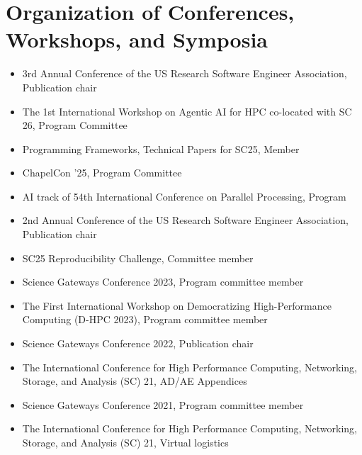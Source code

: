 \documentclass[11pt,a4paper,sans]{moderncv}
\begin{document}
\section{Organization of Conferences, Workshops, and Symposia}
\begin{itemize}[leftmargin=4cm]
\item 3rd Annual Conference of the US Research Software Engineer Association, Publication chair
\item The 1st International Workshop on Agentic AI for HPC co-located with SC 26, Program Committee 
\item Programming Frameworks, Technical Papers for SC25, Member
\item ChapelCon '25, Program Committee 
\item AI track of 54th International Conference on Parallel Processing, Program 
\item 2nd Annual Conference of the US Research Software Engineer Association, Publication chair
\item SC25 Reproducibility Challenge, Committee member
\item Science Gateways Conference 2023, Program committee member
\item The First International Workshop on
Democratizing High-Performance Computing (D-HPC 2023), Program committee member
\item Science Gateways Conference 2022, Publication chair
\item The International Conference for High Performance Computing, Networking, Storage, and Analysis (SC) 21, AD/AE Appendices
\item Science Gateways Conference 2021, Program committee member
\item The International Conference for High Performance Computing, Networking, Storage, and Analysis (SC) 21, Virtual logistics
\end{itemize}
\end{document}
